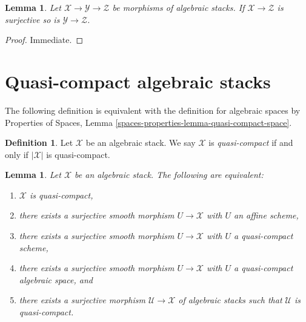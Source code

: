 \documentclass{stacks-project}
\theoremstyle{plain}
\newtheorem{lemma}[subsection]{Lemma}
\theoremstyle{definition}
\newtheorem{definition}[subsection]{Definition}
\theoremstyle{remark}
\numberwithin{equation}{subsection}
\begin{document}
\begin{lemma}
\label{lemma-surjective-permanence}
Let $\mathcal{X} \to \mathcal{Y} \to \mathcal{Z}$ be morphisms of
algebraic stacks. If $\mathcal{X} \to \mathcal{Z}$ is surjective
so is $\mathcal{Y} \to \mathcal{Z}$.
\end{lemma}

\begin{proof}
Immediate.
\end{proof}












\section{Quasi-compact algebraic stacks}
\label{section-quasi-compact}

\noindent
The following definition is equivalent with the definition for algebraic
spaces by
Properties of Spaces, Lemma \ref{spaces-properties-lemma-quasi-compact-space}.

\begin{definition}
\label{definition-quasi-compact}
Let $\mathcal{X}$ be an algebraic stack.
We say $\mathcal{X}$ is {\it quasi-compact}
if and only if $|\mathcal{X}|$ is quasi-compact.
\end{definition}

\begin{lemma}
\label{lemma-quasi-compact-stack}
Let $\mathcal{X}$ be an algebraic stack.
The following are equivalent:
\begin{enumerate}
\item $\mathcal{X}$ is quasi-compact,
\item there exists a surjective smooth morphism $U \to \mathcal{X}$
with $U$ an affine scheme,
\item there exists a surjective smooth morphism $U \to \mathcal{X}$
with $U$ a quasi-compact scheme,
\item there exists a surjective smooth morphism $U \to \mathcal{X}$
with $U$ a quasi-compact algebraic space, and
\item there exists a surjective morphism $\mathcal{U} \to \mathcal{X}$
of algebraic stacks such that $\mathcal{U}$ is quasi-compact.
\end{enumerate}
\end{lemma}
\end{document}

